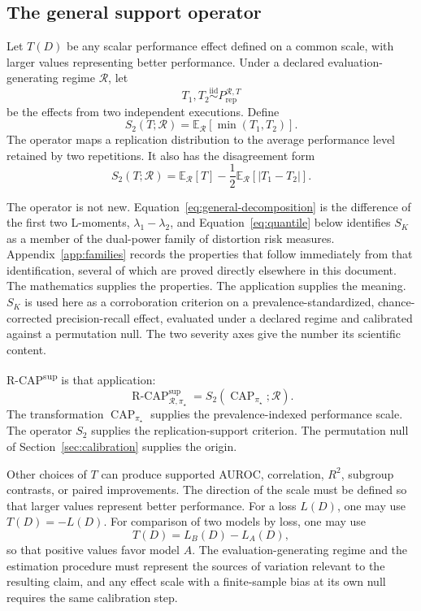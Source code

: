 \documentclass[11pt]{article}
\newcommand{\CAP}{\operatorname{CAP}}
\newcommand{\Regime}{\mathcal{R}}
\newcommand{\E}{\mathbb{E}}
\newcommand{\iid}{\mathrel{\overset{\mathrm{iid}}{\sim}}}
\newcommand{\RCAPfull}{\operatorname{R\text{-}CAP}^{\mathrm{sup}}_{\Regime,\pi_\star}}
\theoremstyle{remark}
\begin{document}
\subsection{The general support operator}

Let $T(D)$ be any scalar performance effect defined on a common scale, with larger values representing better performance. Under a declared evaluation-generating regime $\Regime$, let
\[
T_1,T_2
\iid
P_{\mathrm{rep}}^{\Regime,T}
\]
be the effects from two independent executions. Define
\begin{equation}
S_2(T;\Regime)
=
\E_{\Regime}
\left[
\min(T_1,T_2)
\right].
\label{eq:general}
\end{equation}
The operator maps a replication distribution to the average performance level retained by two repetitions. It also has the disagreement form
\begin{equation}
S_2(T;\Regime)
=
\E_{\Regime}[T]
-
\frac12
\E_{\Regime}[|T_1-T_2|].
\label{eq:general-decomposition}
\end{equation}

The operator is not new. Equation~\eqref{eq:general-decomposition} is the difference of the first two L-moments, $\lambda_1-\lambda_2$, and Equation~\eqref{eq:quantile} below identifies $S_K$ as a member of the dual-power family of distortion risk measures. Appendix~\ref{app:families} records the properties that follow immediately from that identification, several of which are proved directly elsewhere in this document. The mathematics supplies the properties. The application supplies the meaning. $S_K$ is used here as a corroboration criterion on a prevalence-standardized, chance-corrected precision-recall effect, evaluated under a declared regime and calibrated against a permutation null. The two severity axes give the number its scientific content.

R-CAP\textsuperscript{sup} is that application:
\begin{equation}
\RCAPfull
=
S_2(\CAP_{\pi_\star};\Regime).
\label{eq:rcap-as-support-operator}
\end{equation}
The transformation $\CAP_{\pi_\star}$ supplies the prevalence-indexed performance scale. The operator $S_2$ supplies the replication-support criterion. The permutation null of Section~\ref{sec:calibration} supplies the origin.

Other choices of $T$ can produce supported AUROC, correlation, $R^2$, subgroup contrasts, or paired improvements. The direction of the scale must be defined so that larger values represent better performance. For a loss $L(D)$, one may use $T(D)=-L(D)$. For comparison of two models by loss, one may use
\[
T(D)=L_B(D)-L_A(D),
\]
so that positive values favor model $A$. The evaluation-generating regime and the estimation procedure must represent the sources of variation relevant to the resulting claim, and any effect scale with a finite-sample bias at its own null requires the same calibration step.
\end{document}
